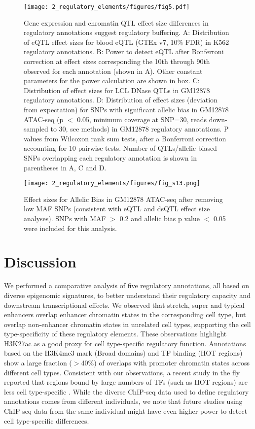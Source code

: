 \begin{figure}
    \centering
    \texttt{[image: 2\_regulatory\_elements/figures/fig5.pdf]}
    \caption{Gene expression and chromatin QTL effect size differences in regulatory annotations suggest regulatory buffering. A: Distribution of eQTL effect sizes for blood eQTL (GTEx v7, 10\% FDR) in K562 regulatory annotations. B: Power to detect eQTL after Bonferroni correction at effect sizes corresponding the 10th through 90th observed for each annotation (shown in A). Other constant parameters for the power calculation are shown in box. C: Distribution of effect sizes for LCL DNase QTLs in GM12878 regulatory annotations. D: Distribution of effect sizes (deviation from expectation) for SNPs with significant allelic bias in GM12878 ATAC-seq (p $<$ 0.05, minimum coverage at SNP=30, reads down-sampled to 30, see methods) in GM12878 regulatory annotations. P values from Wilcoxon rank sum tests, after a Bonferroni correction accounting for 10 pairwise tests. Number of QTLs/allelic biased SNPs overlapping each regulatory annotation is shown in parentheses in A, C and D.}
    \label{fig:c1_f5}
\end{figure}

\begin{figure}
    \centering
    \texttt{[image: 2\_regulatory\_elements/figures/fig\_s13.png]}
    \caption{Effect sizes for Allelic Bias in GM12878 ATAC-seq after removing low MAF SNPs (consistent with eQTL and dsQTL effect size analyses). SNPs with MAF $>$ 0.2 and allelic bias p value $<$ 0.05 were included for this analysis.}
    \label{fig:c1_fs13}
\end{figure}

\section{Discussion}
We performed a comparative analysis of five regulatory annotations, all based on diverse epigenomic signatures, to better understand their regulatory capacity and downstream transcriptional effects. We observed that stretch, super and typical enhancers overlap enhancer chromatin states in the corresponding cell type, but overlap non-enhancer chromatin states in unrelated cell types, supporting the cell type-specificity of these regulatory elements. These observations highlight H3K27ac as a good proxy for cell type-specific regulatory function. Annotations based on the H3K4me3 mark (Broad domains) and TF binding (HOT regions) show a large fraction ($>$40\%) of overlaps with promoter chromatin states across different cell types. Consistent with our observations, a recent study in the fly reported that regions bound by large numbers of TFs (such as HOT regions) are less cell type-specific \cite{kudronModERNResourceGenomeWide2017}. While the diverse ChIP-seq data used to define regulatory annotations comes from different individuals, we note that future studies using ChIP-seq data from the same individual might have even higher power to detect cell type-specific differences.\\


